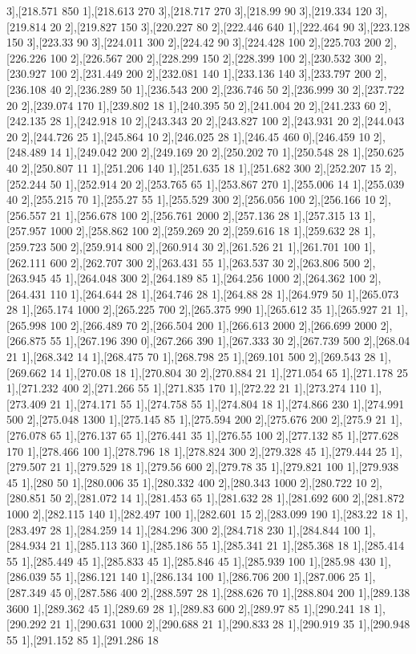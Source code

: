 {3],[218.571 850 1],[218.613 270 3],[218.717 270 3],[218.99 90 3],[219.334 120 3],[219.814 20 2],[219.827 150 3],[220.227 80 2],[222.446 640 1],[222.464 90 3],[223.128 150 3],[223.33 90 3],[224.011 300 2],[224.42 90 3],[224.428 100 2],[225.703 200 2],[226.226 100 2],[226.567 200 2],[228.299 150 2],[228.399 100 2],[230.532 300 2],[230.927 100 2],[231.449 200 2],[232.081 140 1],[233.136 140 3],[233.797 200 2],[236.108 40 2],[236.289 50 1],[236.543 200 2],[236.746 50 2],[236.999 30 2],[237.722 20 2],[239.074 170 1],[239.802 18 1],[240.395 50 2],[241.004 20 2],[241.233 60 2],[242.135 28 1],[242.918 10 2],[243.343 20 2],[243.827 100 2],[243.931 20 2],[244.043 20 2],[244.726 25 1],[245.864 10 2],[246.025 28 1],[246.45 460 0],[246.459 10 2],[248.489 14 1],[249.042 200 2],[249.169 20 2],[250.202 70 1],[250.548 28 1],[250.625 40 2],[250.807 11 1],[251.206 140 1],[251.635 18 1],[251.682 300 2],[252.207 15 2],[252.244 50 1],[252.914 20 2],[253.765 65 1],[253.867 270 1],[255.006 14 1],[255.039 40 2],[255.215 70 1],[255.27 55 1],[255.529 300 2],[256.056 100 2],[256.166 10 2],[256.557 21 1],[256.678 100 2],[256.761 2000 2],[257.136 28 1],[257.315 13 1],[257.957 1000 2],[258.862 100 2],[259.269 20 2],[259.616 18 1],[259.632 28 1],[259.723 500 2],[259.914 800 2],[260.914 30 2],[261.526 21 1],[261.701 100 1],[262.111 600 2],[262.707 300 2],[263.431 55 1],[263.537 30 2],[263.806 500 2],[263.945 45 1],[264.048 300 2],[264.189 85 1],[264.256 1000 2],[264.362 100 2],[264.431 110 1],[264.644 28 1],[264.746 28 1],[264.88 28 1],[264.979 50 1],[265.073 28 1],[265.174 1000 2],[265.225 700 2],[265.375 990 1],[265.612 35 1],[265.927 21 1],[265.998 100 2],[266.489 70 2],[266.504 200 1],[266.613 2000 2],[266.699 2000 2],[266.875 55 1],[267.196 390 0],[267.266 390 1],[267.333 30 2],[267.739 500 2],[268.04 21 1],[268.342 14 1],[268.475 70 1],[268.798 25 1],[269.101 500 2],[269.543 28 1],[269.662 14 1],[270.08 18 1],[270.804 30 2],[270.884 21 1],[271.054 65 1],[271.178 25 1],[271.232 400 2],[271.266 55 1],[271.835 170 1],[272.22 21 1],[273.274 110 1],[273.409 21 1],[274.171 55 1],[274.758 55 1],[274.804 18 1],[274.866 230 1],[274.991 500 2],[275.048 1300 1],[275.145 85 1],[275.594 200 2],[275.676 200 2],[275.9 21 1],[276.078 65 1],[276.137 65 1],[276.441 35 1],[276.55 100 2],[277.132 85 1],[277.628 170 1],[278.466 100 1],[278.796 18 1],[278.824 300 2],[279.328 45 1],[279.444 25 1],[279.507 21 1],[279.529 18 1],[279.56 600 2],[279.78 35 1],[279.821 100 1],[279.938 45 1],[280 50 1],[280.006 35 1],[280.332 400 2],[280.343 1000 2],[280.722 10 2],[280.851 50 2],[281.072 14 1],[281.453 65 1],[281.632 28 1],[281.692 600 2],[281.872 1000 2],[282.115 140 1],[282.497 100 1],[282.601 15 2],[283.099 190 1],[283.22 18 1],[283.497 28 1],[284.259 14 1],[284.296 300 2],[284.718 230 1],[284.844 100 1],[284.934 21 1],[285.113 360 1],[285.186 55 1],[285.341 21 1],[285.368 18 1],[285.414 55 1],[285.449 45 1],[285.833 45 1],[285.846 45 1],[285.939 100 1],[285.98 430 1],[286.039 55 1],[286.121 140 1],[286.134 100 1],[286.706 200 1],[287.006 25 1],[287.349 45 0],[287.586 400 2],[288.597 28 1],[288.626 70 1],[288.804 200 1],[289.138 3600 1],[289.362 45 1],[289.69 28 1],[289.83 600 2],[289.97 85 1],[290.241 18 1],[290.292 21 1],[290.631 1000 2],[290.688 21 1],[290.833 28 1],[290.919 35 1],[290.948 55 1],[291.152 85 1],[291.286 18 }
